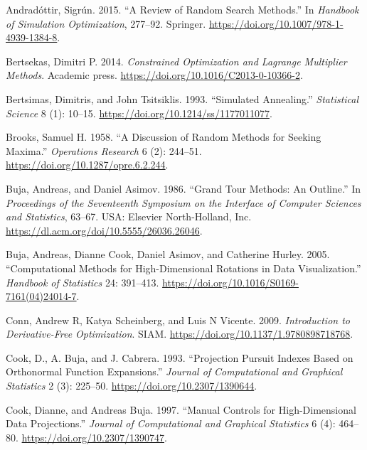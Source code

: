\hypertarget{refs}{}
\begin{CSLReferences}{1}{0}
\leavevmode{}%
Andradóttir, Sigrún. 2015. {``A Review of Random Search Methods.''} In \emph{Handbook of Simulation Optimization}, 277--92. Springer. \url{https://doi.org/10.1007/978-1-4939-1384-8}.

\leavevmode{}%
Bertsekas, Dimitri P. 2014. \emph{Constrained Optimization and Lagrange Multiplier Methods}. Academic press. \url{https://doi.org/10.1016/C2013-0-10366-2}.

\leavevmode{}%
Bertsimas, Dimitris, and John Tsitsiklis. 1993. {``Simulated Annealing.''} \emph{Statistical Science} 8 (1): 10--15. \url{https://doi.org/10.1214/ss/1177011077}.

\leavevmode{}%
Brooks, Samuel H. 1958. {``A Discussion of Random Methods for Seeking Maxima.''} \emph{Operations Research} 6 (2): 244--51. \url{https://doi.org/10.1287/opre.6.2.244}.

\leavevmode{}%
Buja, Andreas, and Daniel Asimov. 1986. {``Grand Tour Methods: An Outline.''} In \emph{Proceedings of the Seventeenth Symposium on the Interface of Computer Sciences and Statistics}, 63--67. USA: Elsevier North-Holland, Inc. \url{https://dl.acm.org/doi/10.5555/26036.26046}.

\leavevmode{}%
Buja, Andreas, Dianne Cook, Daniel Asimov, and Catherine Hurley. 2005. {``Computational Methods for High-Dimensional Rotations in Data Visualization.''} \emph{Handbook of Statistics} 24: 391--413. \url{https://doi.org/10.1016/S0169-7161(04)24014-7}.

\leavevmode{}%
Conn, Andrew R, Katya Scheinberg, and Luis N Vicente. 2009. \emph{Introduction to Derivative-Free Optimization}. SIAM. \url{https://doi.org/10.1137/1.9780898718768}.

\leavevmode{}%
Cook, D., A. Buja, and J. Cabrera. 1993. {``Projection Pursuit Indexes Based on Orthonormal Function Expansions.''} \emph{Journal of Computational and Graphical Statistics} 2 (3): 225--50. \url{https://doi.org/10.2307/1390644}.

\leavevmode{}%
Cook, Dianne, and Andreas Buja. 1997. {``Manual Controls for High-Dimensional Data Projections.''} \emph{Journal of Computational and Graphical Statistics} 6 (4): 464--80. \url{https://doi.org/10.2307/1390747}.


\end{CSLReferences}
